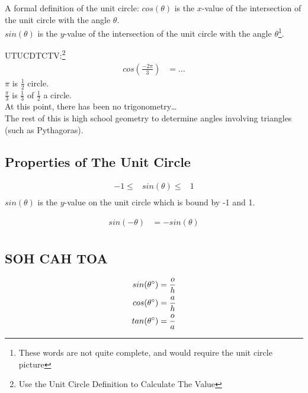 A formal definition of the unit circle:
$cos(\theta)$ is the $x$-value of the intersection of the unit circle with the
angle $\theta$.\\
$sin(\theta)$ is the $y$-value of the intersection of the unit circle with the
angle $\theta$\footnote{These words are not quite complete, and would require
the unit circle picture}.

UTUCDTCTV:\footnote{Use the Unit Circle Definition to Calculate The Value}
\begin{align}
  cos(\frac{-2\pi}{3}) & = \ldots
\end{align}
$\pi$ is $\frac{1}{2}$ circle.\\
$\frac{\pi}{3}$ is $\frac{1}{3}$ of $\frac{1}{2}$ a circle.\\
At this point, there has been no trigonometry\ldots \\
The rest of this is high school geometry to determine angles involving
triangles (such as Pythagoras).

\subsection{Properties of The Unit Circle}
\label{sec:Properties of The Unit Circle}

\begin{align}
  -1 \leq & sin(\theta) \leq & 1 \\
\end{align}
$sin(\theta)$ is the $y$-value on the unit circle which is bound by -1 and 1.

\begin{align}
  sin(-\theta) & = - sin(\theta) \\
\end{align}

\subsection{SOH CAH TOA}
\label{sec:SOHCAHTOA}
\begin{align}
  sin(\theta ^\circ) & = \frac{o}{h} \\
  cos(\theta ^\circ) & = \frac{a}{h} \\
  tan(\theta ^\circ) & = \frac{o}{a}
\end{align}

